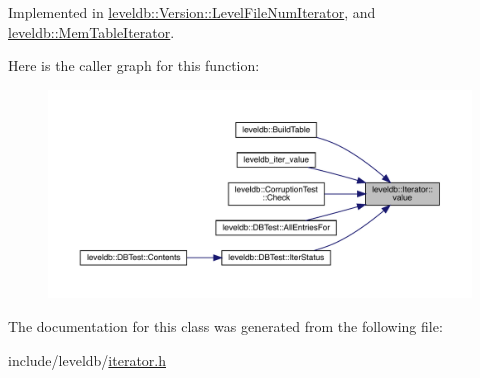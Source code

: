 Implemented in \mbox{\hyperlink{classleveldb_1_1_version_1_1_level_file_num_iterator_af7b7da923a316d8b85f7194c926470db}{leveldb\+::\+Version\+::\+Level\+File\+Num\+Iterator}}, and \mbox{\hyperlink{classleveldb_1_1_mem_table_iterator_a6c2907c8c87d2b2933adcd5f0e01f781}{leveldb\+::\+Mem\+Table\+Iterator}}.

Here is the caller graph for this function\+:
\nopagebreak
\begin{figure}[H]
\begin{center}
\leavevmode
\includegraphics[width=350pt]{classleveldb_1_1_iterator_a613ac2e965518aad7a064c64c72bcf7c_icgraph}
\end{center}
\end{figure}


The documentation for this class was generated from the following file\+:\begin{DoxyCompactItemize}
\item 
include/leveldb/\mbox{\hyperlink{iterator_8h}{iterator.\+h}}\end{DoxyCompactItemize}
